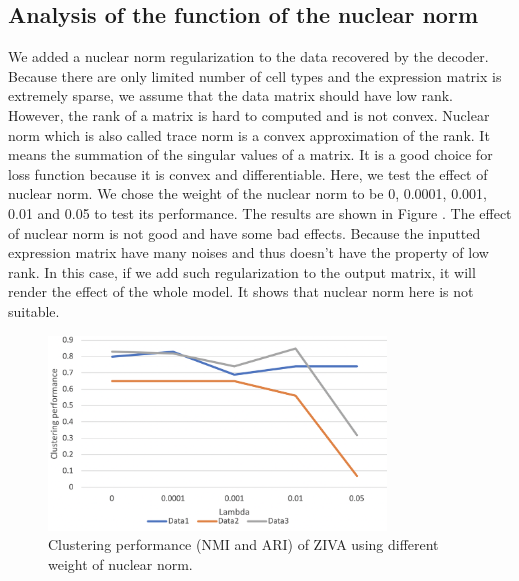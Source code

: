 \clearpage

\subsection{Analysis of the function of the nuclear norm}
We added a nuclear norm regularization to the data recovered by the decoder. Because there are only limited number of cell types and the expression matrix is extremely sparse, we assume that the data matrix should have low rank. However, the rank of a matrix is hard to computed and is not convex. Nuclear norm which is also called trace norm is a convex approximation of the rank. It means the summation of the singular values of a matrix. It is a good choice for loss function because it is convex and differentiable. Here, we test the effect of nuclear norm. We chose the weight of the nuclear norm to be 0, 0.0001, 0.001, 0.01 and 0.05 to test its performance. The results are shown in Figure \cite{nuclear}. The effect of nuclear norm is not good and have some bad effects. Because the inputted expression matrix have many noises and thus doesn't have the property of low rank. In this case, if we add such regularization to the output matrix, it will render the effect of the whole model. It shows that nuclear norm here is not suitable.

\begin{figure}[htb!]
    \centering
    \includegraphics[width=0.8\textwidth]{figures/myfigures/nuclear.png}
    \caption{Clustering performance (NMI and ARI) of ZIVA using different weight of nuclear norm.}
    \label{nuclear}
\end{figure}

\clearpage


